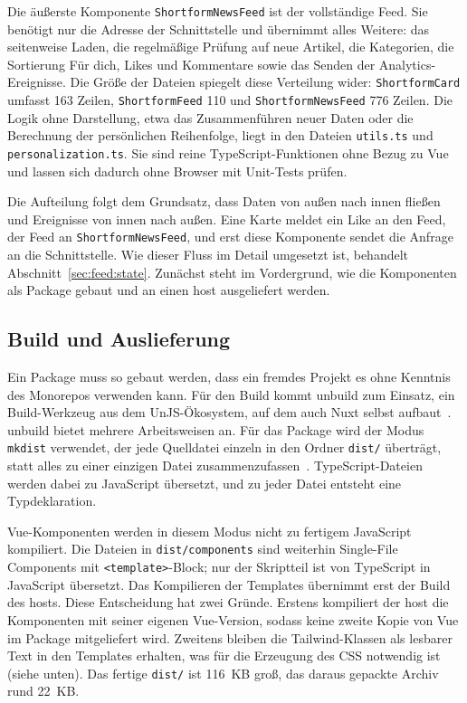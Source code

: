 Die äußerste Komponente \texttt{ShortformNewsFeed} ist der vollständige Feed.
Sie benötigt nur die Adresse der Schnittstelle und übernimmt alles Weitere: das seitenweise Laden, die regelmäßige Prüfung auf neue Artikel, die Kategorien, die Sortierung \glqq Für dich\grqq{}, Likes und Kommentare sowie das Senden der Analytics-Ereignisse.
Die Größe der Dateien spiegelt diese Verteilung wider: \texttt{ShortformCard} umfasst 163 Zeilen, \texttt{ShortformFeed} 110 und \texttt{ShortformNewsFeed} 776 Zeilen.
Die Logik ohne Darstellung, etwa das Zusammenführen neuer Daten oder die Berechnung der persönlichen Reihenfolge, liegt in den Dateien \texttt{utils.ts} und \texttt{personalization.ts}.
Sie sind reine TypeScript-Funktionen ohne Bezug zu Vue und lassen sich dadurch ohne Browser mit Unit-Tests prüfen.

Die Aufteilung folgt dem Grundsatz, dass Daten von außen nach innen fließen und Ereignisse von innen nach außen.
Eine Karte meldet ein Like an den Feed, der Feed an \texttt{ShortformNewsFeed}, und erst diese Komponente sendet die Anfrage an die Schnittstelle.
Wie dieser Fluss im Detail umgesetzt ist, behandelt Abschnitt~\ref{sec:feed:state}.
Zunächst steht im Vordergrund, wie die Komponenten als Package gebaut und an einen \gls{host} ausgeliefert werden.

\subsection{Build und Auslieferung}

Ein Package muss so gebaut werden, dass ein fremdes Projekt es ohne Kenntnis des Monorepos verwenden kann.
Für den Build kommt unbuild zum Einsatz, ein Build-Werkzeug aus dem UnJS-Ökosystem, auf dem auch Nuxt selbst aufbaut~\cite{unbuild}.
unbuild bietet mehrere Arbeitsweisen an.
Für das Package wird der Modus \texttt{mkdist} verwendet, der jede Quelldatei einzeln in den Ordner \texttt{dist/} überträgt, statt alles zu einer einzigen Datei zusammenzufassen~\cite{mkdist}.
TypeScript-Dateien werden dabei zu JavaScript übersetzt, und zu jeder Datei entsteht eine Typdeklaration.

Vue-Komponenten werden in diesem Modus nicht zu fertigem JavaScript kompiliert.
Die Dateien in \texttt{dist/components} sind weiterhin Single-File Components mit \texttt{<template>}-Block; nur der Skriptteil ist von TypeScript in JavaScript übersetzt.
Das Kompilieren der Templates übernimmt erst der Build des \gls{host}s.
Diese Entscheidung hat zwei Gründe.
Erstens kompiliert der \gls{host} die Komponenten mit seiner eigenen Vue-Version, sodass keine zweite Kopie von Vue im Package mitgeliefert wird.
Zweitens bleiben die Tailwind-Klassen als lesbarer Text in den Templates erhalten, was für die Erzeugung des CSS notwendig ist (siehe unten).
Das fertige \texttt{dist/} ist 116~KB groß, das daraus gepackte Archiv rund 22~KB.

